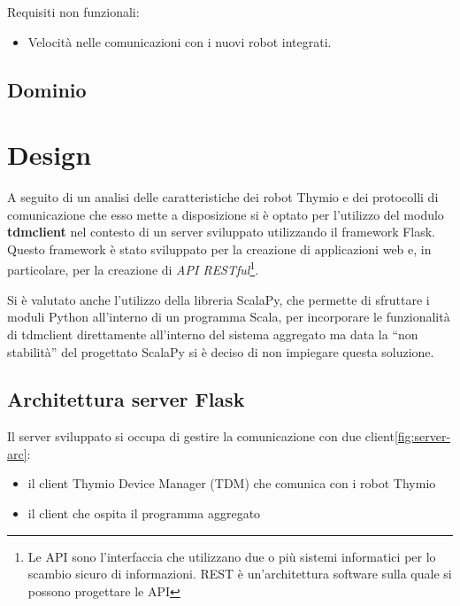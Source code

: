\documentclass[12pt,a4paper,openright,twoside]{book}
\begin{document}
Requisiti non funzionali:
\begin{itemize}
    \item Velocità nelle comunicazioni con i nuovi robot integrati.
\end{itemize}

\section{Dominio}


\chapter{Design}
\label{chap:design}

A seguito di un analisi delle caratteristiche dei robot Thymio e dei protocolli di comunicazione che esso mette a disposizione si è optato per l'utilizzo del modulo \textbf{tdmclient} nel contesto di un server sviluppato utilizzando il framework Flask. Questo framework è stato sviluppato per la creazione di applicazioni web e, in particolare, per la creazione di \textit{API RESTful}\footnote{Le API sono l'interfaccia che utilizzano due o più sistemi informatici per lo scambio sicuro di informazioni. REST è un'architettura software sulla quale si possono progettare le API}. 

Si è valutato anche l'utilizzo della libreria ScalaPy, che permette di sfruttare i moduli Python all'interno di un programma Scala, per incorporare le funzionalità di tdmclient direttamente all'interno del sistema aggregato ma data la ``non stabilità'' del progettato ScalaPy si è deciso di non impiegare questa soluzione.

\section{Architettura server Flask}

Il server sviluppato si occupa di gestire la comunicazione con due client\cref{fig:server-arc}:
\begin{itemize}
    \item il client Thymio Device Manager (TDM) che comunica con i robot Thymio
    \item il client che ospita il programma aggregato
\end{itemize}
\end{document}

